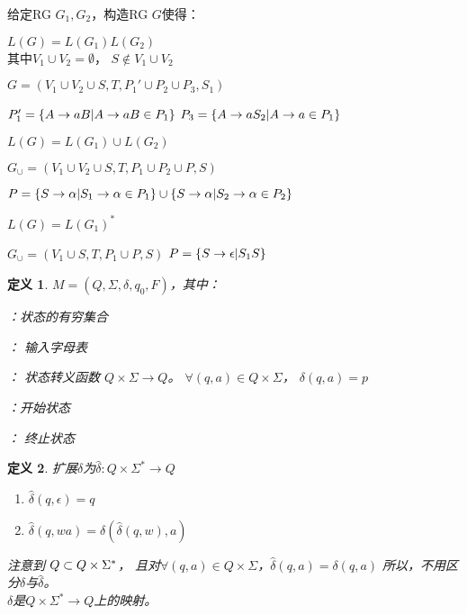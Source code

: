 \documentclass[twocolumn,zihao=5,linespread=1,heading=false,autoindent=0pt]{ctexart}
\DeclarePairedDelimiter{\set}{\{}{\}}
\newenvironment{cenumerate}%
{\begin{enumerate}[parsep=0pt,itemsep=0pt,topsep=0pt,partopsep=0pt]}
{\end{enumerate}}
\theoremstyle{exampstyle} \newtheorem{definition}{定义}[section]
\theoremstyle{exampstyle} \newtheorem{example}{例}[section]
\theoremstyle{exampstyle} \newtheorem{theorem}{定理}[section]
\theoremstyle{exampstyle} \newtheorem{lemma}{引理}[section]
\theoremstyle{exampstyle} \newtheorem{myproof}{证明}[section]
\begin{document}
给定RG $G_1,G_2$，构造RG $G$使得：
\begin{outline}[cenumerate]
    \1 $L(G) = L(G_1)L(G_2)$ \\
        其中$V_1 \cup V_2 = \emptyset$， $S \notin V_1 \cup V_2$

        $G = (V_1 \cup V_2 \cup {S}, T, P_1' \cup P_2 \cup P_3, S_1)$

        $P_1' = \set*{A \to a B | A \to a B \in P_1}$
        $P_3 = \set*{A \to a S_2 | A \to a \in P_1}$

    \1 $L(G) = L(G_1) \cup L(G_2)$

        $G_\cup = (V_1 \cup V_2 \cup {S}, T, P_1 \cup P_2 \cup P, S)$

        $P = \set*{S \to \alpha | S_1 \to \alpha \in P_1} \cup \set*{S \to \alpha | S_2 \to \alpha \in P_2}$

    \1 $L(G) = L(G_1)^*$

    $G_\cup = (V_1 \cup {S}, T, P_1 \cup P, S)$
    $\begin{aligned}
        P & = \set*{S \to \epsilon | S_1S}
    \end{aligned}$
\end{outline}
\begin{definition}
    $M = (Q, \Sigma, \delta, q_0, F)$，其中：

    \begin{description}[parsep=0pt,itemsep=0pt,topsep=0pt,partopsep=0pt]
        \item[$Q$]：状态的有穷集合
        \item[$\Sigma$]： 输入字母表
        \item[$\delta$]： 状态转义函数
            $Q\times\Sigma \to Q$。 $\forall (q,a) \in Q\times\Sigma$，
            $\delta(q,a) = p$
        \item[$q_0$]：开始状态
        \item[$F$]： 终止状态 
    \end{description}
\end{definition}
\begin{definition}
    扩展$\delta$为$\hat{\delta}: Q \times \Sigma^* \to Q$
    \begin{cenumerate}
        \item $\hat{\delta}(q,\epsilon) = q$
        \item $\hat{\delta}(q, wa) = \delta(\hat{\delta}(q,w), a)$
    \end{cenumerate}
    注意到 $Q \time \Sigma \subset Q \times \Sigma^*$，
    且对$\forall (q, a) \in Q \times \Sigma$，$\hat{\delta}(q, a) = \delta(q, a)$
    所以，不用区分$\delta$与$\hat{\delta}$。 \\
    $\delta$是$Q \times \Sigma^* \to Q$上的映射。
\end{definition}
\end{document}
